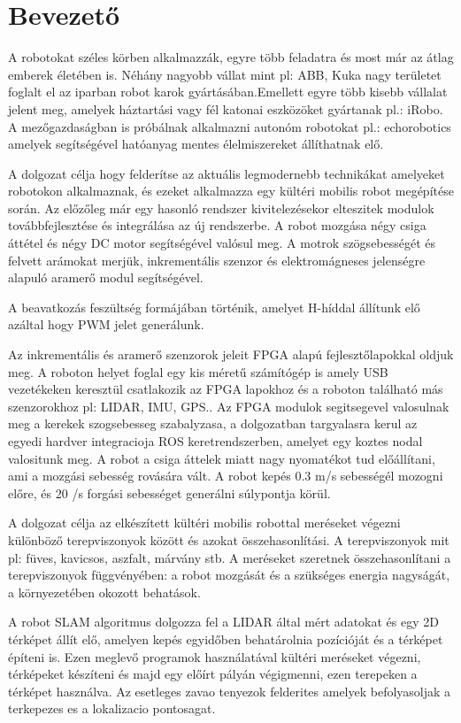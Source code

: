 \chapter{Bevezető}
A robotokat széles körben alkalmazzák, egyre több feladatra és most már az átlag emberek életében is. Néhány nagyobb vállat mint pl: ABB, Kuka nagy területet foglalt el az iparban robot karok gyártásában.Emellett egyre több kisebb vállalat jelent meg, amelyek háztartási vagy fél katonai eszközöket gyártanak pl.: iRobo. A mezőgazdaságban is próbálnak alkalmazni autonóm robotokat pl.: echorobotics amelyek segítségével hatóanyag mentes élelmiszereket állíthatnak elő.

A dolgozat célja hogy felderítse az aktuális legmodernebb technikákat amelyeket robotokon alkalmaznak, és ezeket alkalmazza egy kültéri mobilis robot megépítése során.
Az előzőleg már egy hasonló rendszer kivitelezésekor elteszitek modulok továbbfejlesztése és integrálása az új rendszerbe. A robot mozgása négy csiga áttétel és négy DC motor segítségével valósul meg. A motrok szögsebességét és  felvett arámokat merjük, inkrementális szenzor és elektromágneses jelenségre alapuló aramerő modul segítségével.

A beavatkozás feszültség formájában történik, amelyet H-híddal állítunk elő azáltal hogy PWM jelet generálunk.

Az inkrementális és aramerő szenzorok jeleit FPGA alapú fejlesztőlapokkal oldjuk meg. A roboton helyet foglal egy kis méretű számítógép is amely USB vezetékeken keresztül csatlakozik az FPGA lapokhoz és a roboton található más szenzorokhoz pl: LIDAR, IMU, GPS..
Az FPGA modulok segitsegevel valosulnak meg a kerekek szogsebesseg szabalyzasa, a dolgozatban targyalasra kerul az egyedi hardver integracioja ROS keretrendszerben, amelyet egy koztes nodal valositunk meg.
A robot a csiga áttelek miatt nagy nyomatékot tud előállítani, ami a mozgási sebesség rovására vált. A robot kepés 0.3 m/s sebességél mozogni előre, és 20 \degree/s forgási sebességet generálni súlypontja körül.

A dolgozat célja az elkészített kültéri mobilis robottal meréseket végezni különböző terepviszonyok között és azokat összehasonlítási. A terepviszonyok mit pl: füves, kavicsos, aszfalt, márvány stb. A meréseket szeretnek összehasonlítani a terepviszonyok függvényében: a robot mozgását és a szükséges energia nagyságát, a környezetében okozott behatások.

A robot SLAM algoritmus  dolgozza fel a LIDAR által mért adatokat és egy 2D térképet állít elő, amelyen kepés egyidőben behatárolnia pozícióját és a térképet építeni is. Ezen meglevő programok használatával kültéri meréseket végezni, térképeket készíteni és majd egy előírt pályán végigmenni, ezen terepeken a térképet használva. Az esetleges zavao tenyezok felderites amelyek befolyasoljak a terkepezes es a lokalizacio pontosagat.
